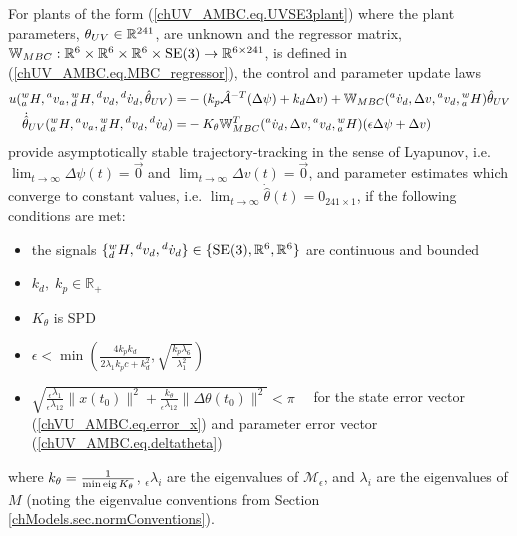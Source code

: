 \begin{UV_AMBC}
\label{chUV_AMBC.theo.UV_AMBC}

For plants of the form (\ref{chUV_AMBC.eq.UVSE3plant}) where the plant
parameters, $\theta_{UV}\in\mathbb{R}^{241}$, are unknown and the regressor
matrix,
$\MBCreg:\mathbb{R}^6\times\mathbb{R}^6\times\mathbb{R}^6\times\SE3\to
\mathbb{R}^{6 \times 241}$, is defined in
(\ref{chUV_AMBC.eq.MBC_regressor}), the control and parameter update
laws
%
\begin{align}
u( {^w_a}H, {^a}v_a, {^w_d}H, {^d}v_d, {^d}\dot{v}_d, \hat{\theta}_{UV})
 =&-(k_p\hat{\mathcal{A}}^{-T}(\Delta \psi)+k_d\Delta v)
  +\mathbb{W}_{MBC}({^a}\dot{v}_d,\Delta v, {^a}v_d , {^w_a}H)\hat{\theta}_{UV}
\label{chUV_AMBC.eq.AMBC_controlLaw} \\
\dot{\hat{\theta}}_{UV}({^w_a}H, {^a}v_a, {^w_d}H, {^d}v_d, {^d}\dot{v}_d)
 =&-K_\theta \mathbb{W}_{MBC}^T ({^a}\dot{v}_d,\Delta v, {^a}v_d ,
  {^w_a}H) (\epsilon \Delta \psi + \Delta v)
\label{chUV_AMBC.eq.AMBC_paramUpdateLaw}
\end{align}
%
provide asymptotically stable trajectory-tracking in the
sense of Lyapunov, i.e.  $\lim_{t\to \infty}\Delta \psi(t)=\vec{0}$
and $\lim_{t\to \infty}\Delta v(t)=\vec{0}$, and parameter estimates
which converge to constant values, i.e. $\lim_{t\to
  \infty}\dot{\hat{\theta}}(t)=0_{241 \times 1}$, if the following
conditions are met:

\begin{itemize}
\item the signals $\{{^w_d}H,{^d}v_d,{^d}\dot{v}_d
  \}\in\{\SE3,\realSpace{6},\realSpace{6}\}$ are continuous and bounded
\item $k_d,\; k_p \in \mathbb{R}_+$
\item $K_\theta$ is \ac{SPD}
\item $\epsilon<\min\left(\frac{4 k_p k_d}{2 \lambda_1 k_p c
    +k_d^2},\sqrt{\frac{k_p \lambda_6}{\lambda_1^{2}}} \right)$
\item $\sqrt{
      \frac{{_\epsilon}\lambda_1}{{_\epsilon}\lambda_{12}}\|x(t_0)\|^2+
      \frac{k_\theta}{{_\epsilon}\lambda_{12}}\|\Delta \theta(t_0)\|^2
       } <\pi \quad$
%
       for the state error vector (\ref{chVU_AMBC.eq.error_x}) and
       parameter error vector (\ref{chUV_AMBC.eq.deltatheta})
\end{itemize}
%
where $k_{\theta}=\frac{1}{\min{\operatorname{eig}{K_\theta}}}$,
${_\epsilon}\lambda_{i}$ are the eigenvalues of
$\mathcal{M}_\epsilon$, and $\lambda_i$ are the eigenvalues of $M$
(noting the eigenvalue conventions from Section \ref{chModels.sec.normConventions}).
%
\end{UV_AMBC}

